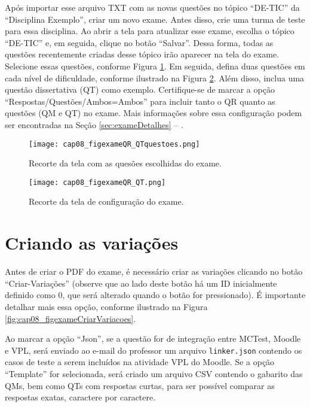 Após importar esse arquivo TXT com as novas questões no tópico ``DE-TIC'' da ``Disciplina Exemplo'', criar um novo exame. Antes disso, crie uma turma de teste para essa disciplina. Ao abrir a tela para atualizar esse exame, escolha o tópico ``DE-TIC'' e, em seguida, clique no botão ``Salvar''. Dessa forma, todas as questões recentemente criadas desse tópico irão aparecer na tela do exame. Selecione essas questões, conforme Figura \ref{fig:cap08_figexameQR_QTquestoes}. Em seguida, defina duas questões em cada nível de dificuldade, conforme ilustrado na Figura \ref{fig:cap08_figexameQR_QT}. Além disso, inclua uma questão dissertativa (QT) como exemplo. Certifique-se de marcar a opção ``Respostas/Questões/Ambos=Ambos'' para incluir tanto o QR quanto as questões (QM e QT) no exame. Mais informações sobre essa configuração podem ser encontradas na Seção \ref{sec:exameDetalhes} -- .

\begin{figure}[!ht]
  \centering
  \texttt{[image: cap08\_figexameQR\_QTquestoes.png]}
   \caption{Recorte da tela com as quesões escolhidas do exame.}
\label{fig:cap08_figexameQR_QTquestoes}
\end{figure}

\begin{figure}[!ht]
  \centering
  \texttt{[image: cap08\_figexameQR\_QT.png]}
   \caption{Recorte da tela de configuração do exame.}
\label{fig:cap08_figexameQR_QT}
\end{figure}

\section{Criando as variações}

Antes de criar o PDF do exame, é necessário criar as variações clicando no botão ``Criar-Variações'' (observe que ao lado deste botão há um ID inicialmente definido como 0, que será alterado quando o botão for pressionado). É importante detalhar mais essa opção, conforme ilustrado na Figura \ref{fig:cap08_figexameCriarVariacoes}.

Ao marcar a opção ``Json'', se a questão for de integração entre MCTest, Moodle e VPL, será enviado ao e-mail do professor um arquivo \verb|linker.json| contendo os casos de teste a serem incluídos na atividade VPL do Moodle. Se a opção ``Template'' for selecionada, será criado um arquivo CSV contendo o gabarito das QMs, bem como QTs com respostas curtas, para ser possível comparar as respostas exatas, caractere por caractere.

